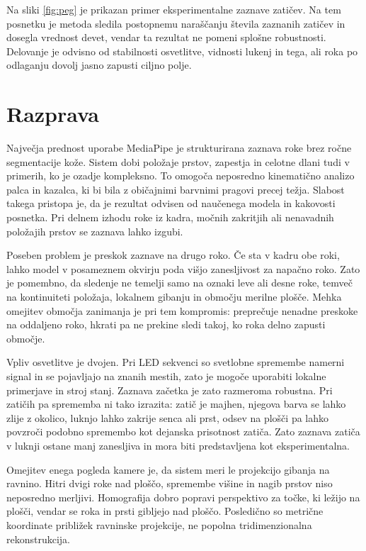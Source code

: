 \documentclass[journal,a4paper,twoside]{sty/IEEEtran}
\begin{document}
Na sliki \ref{fig:peg} je prikazan primer eksperimentalne zaznave zatičev. Na tem posnetku je metoda sledila postopnemu naraščanju števila zaznanih zatičev in dosegla vrednost devet, vendar ta rezultat ne pomeni splošne robustnosti. Delovanje je odvisno od stabilnosti osvetlitve, vidnosti lukenj in tega, ali roka po odlaganju dovolj jasno zapusti ciljno polje.

\section{Razprava}

Največja prednost uporabe MediaPipe je strukturirana zaznava roke brez ročne segmentacije kože. Sistem dobi položaje prstov, zapestja in celotne dlani tudi v primerih, ko je ozadje kompleksno. To omogoča neposredno kinematično analizo palca in kazalca, ki bi bila z običajnimi barvnimi pragovi precej težja. Slabost takega pristopa je, da je rezultat odvisen od naučenega modela in kakovosti posnetka. Pri delnem izhodu roke iz kadra, močnih zakritjih ali nenavadnih položajih prstov se zaznava lahko izgubi.

Poseben problem je preskok zaznave na drugo roko. Če sta v kadru obe roki, lahko model v posameznem okvirju poda višjo zanesljivost za napačno roko. Zato je pomembno, da sledenje ne temelji samo na oznaki leve ali desne roke, temveč na kontinuiteti položaja, lokalnem gibanju in območju merilne plošče. Mehka omejitev območja zanimanja je pri tem kompromis: preprečuje nenadne preskoke na oddaljeno roko, hkrati pa ne prekine sledi takoj, ko roka delno zapusti območje.

Vpliv osvetlitve je dvojen. Pri LED sekvenci so svetlobne spremembe namerni signal in se pojavljajo na znanih mestih, zato je mogoče uporabiti lokalne primerjave in stroj stanj. Zaznava začetka je zato razmeroma robustna. Pri zatičih pa sprememba ni tako izrazita: zatič je majhen, njegova barva se lahko zlije z okolico, luknjo lahko zakrije senca ali prst, odsev na plošči pa lahko povzroči podobno spremembo kot dejanska prisotnost zatiča. Zato zaznava zatiča v luknji ostane manj zanesljiva in mora biti predstavljena kot eksperimentalna.

Omejitev enega pogleda kamere je, da sistem meri le projekcijo gibanja na ravnino. Hitri dvigi roke nad ploščo, spremembe višine in nagib prstov niso neposredno merljivi. Homografija dobro popravi perspektivo za točke, ki ležijo na plošči, vendar se roka in prsti gibljejo nad ploščo. Posledično so metrične koordinate približek ravninske projekcije, ne popolna tridimenzionalna rekonstrukcija.
\end{document}
